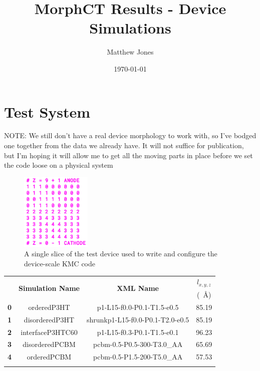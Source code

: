 \documentclass[12pt]{article}
\title{MorphCT Results - Device Simulations}
\author{Matthew Jones}
\date{\today}
\def\ccg{\cellcolor{gray}}
\begin{document}
\maketitle


\section{Test System}

NOTE: We still don't have a real device morphology to work with, so I've bodged one together from the data we already have.
It will not suffice for publication, but I'm hoping it will allow me to get all the moving parts in place before we set the code loose on a physical system

\begin{figure}[h!]\centering
	\includegraphics[width=0.3\textwidth]{Figures/device.png}
    \caption{A single slice of the test device used to write and configure the device-scale KMC code}
	\label{fig:device}
\end{figure}

\begin{center}
\begin{tabular}{| c | c | c | c |}
\hline
\rule{0pt}{2.5ex} 
\multirow{2}{*}{\textbf{ID}}&\multirow{2}{*}{\textbf{Simulation Name}}&\multirow{2}{*}{\textbf{XML Name}}&\textbf{$l_{x,y,z}$}\\
                            &&&(\SI{}{\AA})\\
\hhline{|====|}
\rule{0pt}{2.5ex}\textbf{\ccg0}&\ccg orderedP3HT&\ccg p1-L15-f0.0-P0.1-T1.5-e0.5&\ccg 85.19\\
\textbf{1}&disorderedP3HT&shrunkp1-L15-f0.0-P0.1-T2.0-e0.5&85.19\\
\textbf{\ccg2}&\ccg interfaceP3HTC60&\ccg p1-L15-f0.3-P0.1-T1.5-e0.1&\ccg 96.23\\
\textbf{3}&disorderedPCBM&pcbm-0.5-P0.5-300-T3.0\_AA&65.69\\
\textbf{\ccg4}&\ccg orderedPCBM&\ccg pcbm-0.5-P1.5-200-T5.0\_AA&\ccg 57.53\\
\hhline{----}
\end{tabular}\label{table:cells}
\end{center}
\end{document}
